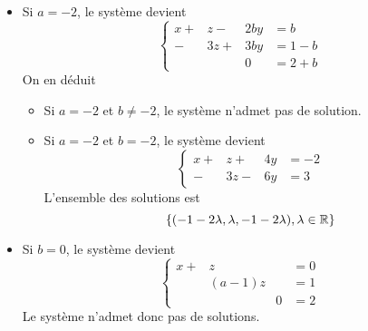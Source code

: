 \begin{enumerate}
\begin{itemize}
\item Si $a=-2$, le système devient
\begin{displaymath}
\left\lbrace  
\begin{aligned}
x + &z - &2b y &= b \\
-&3z + &3by &= 1-b \\
&  &0 &= 2 +b
\end{aligned}
\right. 
\end{displaymath}
On en déduit
\begin{itemize}
  \item Si $a=-2$ et $b\neq -2$, le système n'admet pas de solution.
  \item Si $a=-2$ et $b=-2$, le système devient
\begin{displaymath}
\left\lbrace  
\begin{aligned}
x + &z + &4y &= -2 \\
-&3z - &6y &= 3
\end{aligned}
\right. 
\end{displaymath}
L'ensemble des solutions est
\begin{displaymath}
\left\lbrace (-1-2\lambda, \lambda, -1-2\lambda), \lambda \in \mathbb{R}\right\rbrace 
\end{displaymath}
\end{itemize}

\item Si $b=0$, le système devient
\begin{displaymath}
\left\lbrace  
\begin{aligned}
x + &z  & &= 0 \\
&(a-1)z  & &= 1 \\
&  &0 &= 2
\end{aligned}
\right. 
\end{displaymath}
Le système n'admet donc pas de solutions.
\end{itemize}

\end{enumerate}
